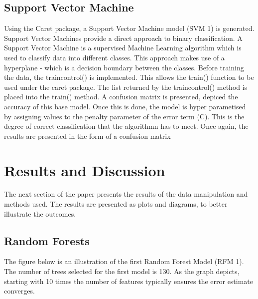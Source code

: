 \documentclass[11pt,preprint, authoryear]{elsarticle}
\numberwithin{equation}{section}
\numberwithin{figure}{section}
\numberwithin{table}{section}
\begin{document}
\newpage

\hypertarget{support-vector-machine}{%
\subsection{Support Vector Machine}\label{support-vector-machine}}

Using the Caret package, a Support Vector Machine model (SVM 1) is
generated. Support Vector Machines provide a direct approach to binary
classification. A Support Vector Machine is a supervised Machine
Learning algorithm which is used to classify data into different
classes. This approach makes use of a hyperplane - which is a decision
boundary between the classes. Before training the data, the
traincontrol() is implemented. This allows the train() function to be
used under the caret package. The list returned by the traincontrol()
method is placed into the train() method. A confusion matrix is
presented, depiced the accuracy of this base model. Once this is done,
the model is hyper parametised by assigning values to the penalty
parameter of the error term (C). This is the degree of correct
classification that the algorithmn has to meet. Once again, the results
are presented in the form of a confusion matrix

\newpage

\hypertarget{results-and-discussion}{%
\section{Results and Discussion}\label{results-and-discussion}}

The next section of the paper presents the results of the data
manipulation and methods used. The results are presented as plots and
diagrams, to better illustrate the outcomes.

\hypertarget{random-forests-1}{%
\subsection{Random Forests}\label{random-forests-1}}

The figure below is an illustration of the first Random Forest Model
(RFM 1). The number of trees selected for the first model is 130. As the
graph depicts, starting with 10 times the number of features typically
ensures the error estimate converges.
\end{document}
